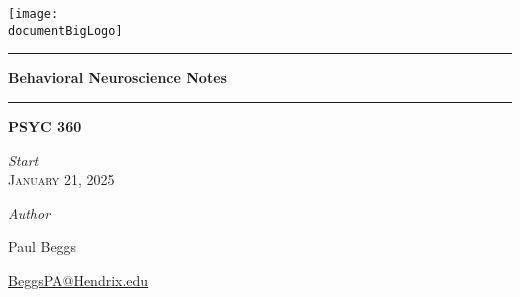 \documentclass[12pt, oneside]{book}
\newcommand{\documentBigLogo}{images/logo_white_text.png}
\newcounter{BoxCounter}
\begin{document}



\newcommand{\titlestandin}{Behavioral Neuroscience Notes}
\newcommand{\cussubtitle}{PSYC 360}
\newcommand{\startdate}{January 21, 2025}
\newcommand{\customenddate}{May 14, 2025}
\newcommand{\professor}{Prof. Jennifer Peszka, Ph.D.}




\begin{titlepage}
    \begin{center}

        \vspace*{-2cm}
        \texttt{[image: \\documentBigLogo]}\\ 
        \vfill

        \textcolor{horange}{\rule{\textwidth}{1.0pt}}

        \vspace{2em}

        {\huge \textbf{\titlestandin}}

        \vspace{1em} %

        \textcolor{horange}{\rule{\textwidth}{1.0pt}}

        \vspace*{1\baselineskip}

        {\LARGE \textbf{\cussubtitle}}

        \begin{large}
            \vspace*{2\baselineskip}

            \textit{Start}  \\[1ex]
            {\scshape \startdate} \\[0.3\baselineskip] %

            \vspace*{1\baselineskip}

            \emph{Author} \\[1ex]
            {\Large Paul Beggs \\ \par} %
            {\href{mailto:BeggsPA@Hendrix.edu}{{BeggsPA@Hendrix.edu}}}\\ %


\end{large}
\end{center}
\end{titlepage}
\end{document}
